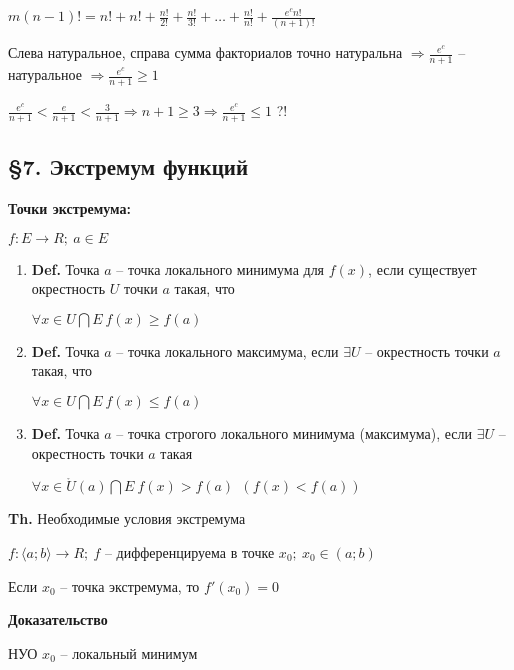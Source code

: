\documentclass[14pt, letter paper]{article}
\newcommand{\q}[1]{\langle #1 \rangle}
\begin{document}
$m (n - 1)! = n! + n! + \frac{n!}{2!} + \frac{n!}{3!} + \ldots + \frac{n!}{n!} + \frac{e^c n!}{(n + 1)!}$

Слева натуральное, справа сумма факториалов точно натуральна $\Rightarrow \frac{e^c}{n + 1}$ -- натуральное $\Rightarrow \frac{e^c}{n + 1} \geq 1$

$\frac{e^c}{n + 1} < \frac{e}{n + 1} < \frac{3}{n + 1} \Rightarrow n + 1 \geq 3 \Rightarrow \frac{e^c}{n + 1} \leq 1$ ?!

\begin{center}
    \subsection*{\S 7. Экстремум функций}
\end{center}

\textbf{Точки экстремума:}

$f : E \rightarrow R;\ a \in E$

\begin{enumerate}
    \item \textbf{Def.} Точка $a$ -- точка локального минимума для $f(x)$, если существует окрестность $U$ точки $a$ такая, что 

    $\forall x \in U \bigcap E\ f(x) \geq f(a)$

    \item \textbf{Def.} Точка $a$ -- точка локального максимума, если $\exists U$ -- окрестность точки $a$ такая, что 

    $\forall x \in U \bigcap E\ f(x) \leq f(a)$

    \item \textbf{Def.} Точка $a$ -- точка строгого локального минимума (максимума), если $\exists U$ -- окрестность точки $a$ такая

    $\forall x \in \mathring{U}(a) \bigcap E\ f(x) > f(a)\ \ (f(x) < f(a))$
\end{enumerate}

\vspace{5mm}

\textbf{Th.} Необходимые условия экстремума

$f : \q{a; b} \rightarrow R;\ f$ -- дифференцируема в точке $x_0;\ x_0 \in (a; b)$

Если $x_0$ -- точка экстремума, то $f'(x_0) = 0$

\begin{center}
    \textbf{Доказательство}
\end{center}

НУО $x_0$ -- локальный минимум
\end{document}
